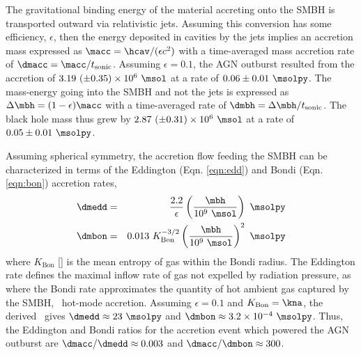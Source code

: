 \documentclass[useAMS,usenatbib]{mn2e}
\begin{document}
The gravitational binding energy of the material accreting onto the
SMBH is transported outward via relativistic jets. Assuming this
conversion has some efficiency, $\epsilon$, then the energy deposited
in cavities by the jets implies an accretion mass expressed as $\macc
= \hcav/(\epsilon c^2)$ with a time-averaged mass accretion rate of
$\dmacc = \macc/t_{\mathrm{sonic}}$. Assuming $\epsilon = 0.1$, the
AGN outburst resulted from the accretion of $3.19 ~(\pm 0.35) \times
10^{6} ~\msol$ at a rate of $0.06 \pm 0.01 ~\msolpy$. The mass-energy
going into the SMBH and not the jets is expressed as $\Delta \mbh =
(1-\epsilon) \macc$ with a time-averaged rate of $\dmbh = \Delta
\mbh/t_{\mathrm{sonic}}$. The black hole mass thus grew by $2.87 ~(\pm
0.31) \times 10^{6} ~\msol$ at a rate of $0.05 \pm 0.01 ~\msolpy$.

Assuming spherical symmetry, the accretion flow feeding the SMBH can
be characterized in terms of the Eddington (Eqn. \ref{eqn:edd}) and
Bondi (Eqn. \ref{eqn:bon}) accretion rates,
\begin{eqnarray}
  \dmedd &=& \frac{2.2}{\epsilon} \left(\frac{\mbh}{10^9~\msol}\right)
  ~\msolpy  \label{eqn:edd}\\
  \dmbon &=& 0.013 ~K_{\mathrm{Bon}}^{-3/2} \left(\frac{\mbh}{10^9
    ~\msol}\right)^{2} ~\msolpy \label{eqn:bon}
\end{eqnarray}
where $K_{\mathrm{Bon}}$ [\ent] is the mean entropy of gas within the
Bondi radius. The Eddington rate defines the maximal inflow rate of
gas not expelled by radiation pressure, as where the Bondi rate
approximates the quantity of hot ambient gas captured by the SMBH,
\ie\ hot-mode accretion. Assuming $\epsilon = 0.1$ and
$K_{\mathrm{Bon}} = \kna$, the derived \mbh\ gives $\dmedd \approx 23
~\msolpy$ and $\dmbon \approx 3.2 \times 10^{-4} ~\msolpy$. Thus, the
Eddington and Bondi ratios for the accretion event which powered the
AGN outburst are $\dmacc/\dmedd \approx 0.003$ and $\dmacc/\dmbon
\approx 300$.
\end{document}
